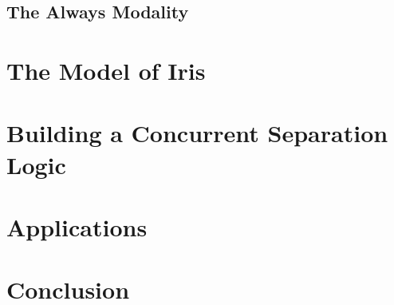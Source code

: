 \documentclass{amsart}
\begin{document}
\subsection{The Always Modality}

\section{The Model of Iris}

\section{Building a Concurrent Separation Logic}

\section{Applications}

\section{Conclusion}



{}
\end{document}
